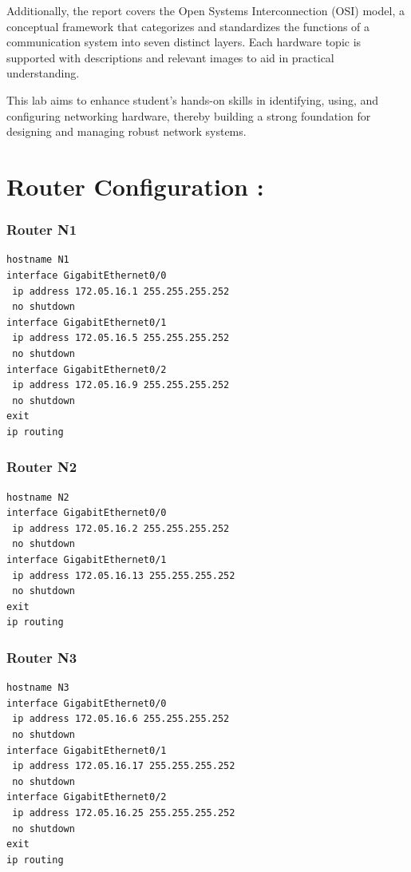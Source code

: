 \documentclass[12pt]{report}
\begin{document}
Additionally, the report covers the Open Systems Interconnection (OSI) model, a conceptual framework that categorizes and standardizes the functions of a communication system into seven distinct layers. Each hardware topic is supported with descriptions and relevant images to aid in practical understanding.

This lab aims to enhance student's hands-on skills in identifying, using, and configuring networking hardware, thereby building a strong foundation for designing and managing robust network systems.

\newpage

\chapter{Router Configuration :}

\subsection{Router N1}
\begin{lstlisting}[basicstyle=\ttfamily\small, frame=single]
hostname N1
interface GigabitEthernet0/0
 ip address 172.05.16.1 255.255.255.252
 no shutdown
interface GigabitEthernet0/1
 ip address 172.05.16.5 255.255.255.252
 no shutdown
interface GigabitEthernet0/2
 ip address 172.05.16.9 255.255.255.252
 no shutdown
exit
ip routing
\end{lstlisting}
\newpage
\subsection{Router N2}
\begin{lstlisting}[basicstyle=\ttfamily\small, frame=single]
hostname N2
interface GigabitEthernet0/0
 ip address 172.05.16.2 255.255.255.252
 no shutdown
interface GigabitEthernet0/1
 ip address 172.05.16.13 255.255.255.252
 no shutdown
exit
ip routing
\end{lstlisting}

\subsection{Router N3}
\begin{lstlisting}[basicstyle=\ttfamily\small, frame=single]
hostname N3
interface GigabitEthernet0/0
 ip address 172.05.16.6 255.255.255.252
 no shutdown
interface GigabitEthernet0/1
 ip address 172.05.16.17 255.255.255.252
 no shutdown
interface GigabitEthernet0/2
 ip address 172.05.16.25 255.255.255.252
 no shutdown
exit
ip routing
\end{lstlisting}
\end{document}
